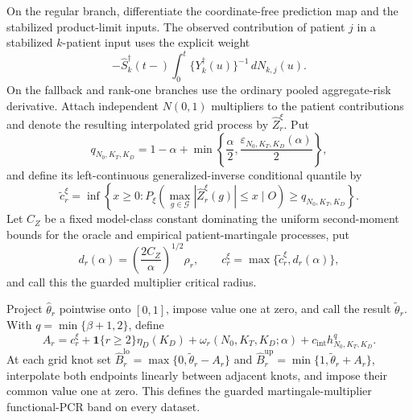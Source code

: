 On the regular branch, differentiate the coordinate-free prediction map and the stabilized product-limit inputs. The observed contribution of patient \(j\) in a stabilized \(k\)-patient input uses the explicit weight
\[
 -\widehat S_k^\dagger(t-)
 \int_0^t\{Y_k^\dagger(u)\}^{-1}\,dN_{k,j}(u).
\]
On the fallback and rank-one branches use the ordinary pooled aggregate-risk derivative. Attach independent \(N(0,1)\) multipliers to the patient contributions and denote the resulting interpolated grid process by \(\widehat Z_r^\xi\). Put
\[
 q_{N_0,K_T,K_D}=1-\alpha+
 \min\left\{\frac\alpha2,
 \frac{\varepsilon_{N_0,K_T,K_D}(\alpha)}2\right\},
\]
and define its left-continuous generalized-inverse conditional quantile by
\[
 \widetilde c_r^\xi=
 \inf\left\{x\ge0:
 P_\xi\left(\max_{g\in\mathcal G}|\widehat Z_r^\xi(g)|\le x
 \mid O\right)\ge q_{N_0,K_T,K_D}\right\}.
\]
Let \(C_Z\) be a fixed model-class constant dominating the uniform second-moment bounds for the oracle and empirical patient-martingale processes, put
\[
 d_r(\alpha)=\left(\frac{2C_Z}{\alpha}\right)^{1/2}\rho_r,
 \qquad c_r^\xi=\max\{\widetilde c_r^\xi,d_r(\alpha)\},
\]
and call this the guarded multiplier critical radius.

Project \(\widehat\theta_r\) pointwise onto \([0,1]\), impose value one at zero, and call the result \(\widetilde\theta_r\). With \(q=\min\{\beta+1,2\}\), define
\[
 A_r=c_r^\xi+\mathbf1\{r\ge2\}\eta_D(K_D)
 +\omega_r(N_0,K_T,K_D;\alpha)+c_{\mathrm{int}}h_{N_0,K_T,K_D}^{q}.
\]
At each grid knot set \(\widehat B_r^{\mathrm{lo}}=\max\{0,\widetilde\theta_r-A_r\}\) and \(\widehat B_r^{\mathrm{up}}=\min\{1,\widetilde\theta_r+A_r\}\), interpolate both endpoints linearly between adjacent knots, and impose their common value one at zero. This defines the guarded martingale-multiplier functional-PCR band on every dataset.